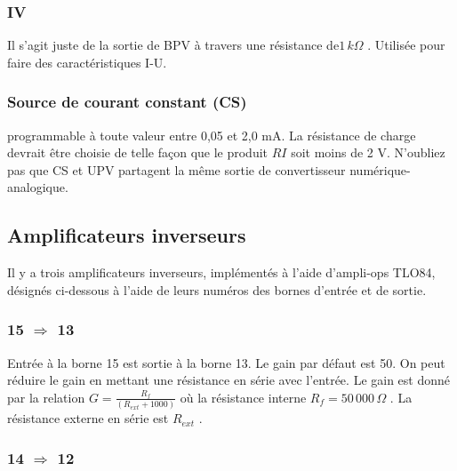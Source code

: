 \documentclass{book}
\begin{document}
\subsubsection{IV}





Il s'agit juste de la sortie de BPV à travers une résistance de$1\, k\Omega$ . Utilisée pour faire des caractéristiques I-U.




\subsubsection{Source de courant constant (CS)}





programmable à toute valeur entre 0,05 et 2,0 mA. La résistance de charge devrait être choisie de telle façon que le produit $RI$  soit moins de 2 V. N'oubliez pas que CS et UPV partagent la même sortie de convertisseur numérique-analogique.




\subsection{Amplificateurs inverseurs}





Il y a trois amplificateurs inverseurs, implémentés à l'aide d'ampli-ops TLO84, désignés ci-dessous à l'aide de leurs numéros des bornes d'entrée et de sortie.




\subsubsection{15 $\Rightarrow$ 13}





Entrée à la borne 15 est sortie à la borne 13. Le gain par défaut est 50. On peut réduire le gain en mettant une résistance en série avec l'entrée. Le gain est donné par la relation $G=\frac{R_{f}}{(R_{ext}+1000)}$  où la résistance interne $R_{f}=50\,000\,\Omega$ . La résistance externe en série est $R_{ext}$ .




\subsubsection{14 $\Rightarrow$ 12}
\end{document}
